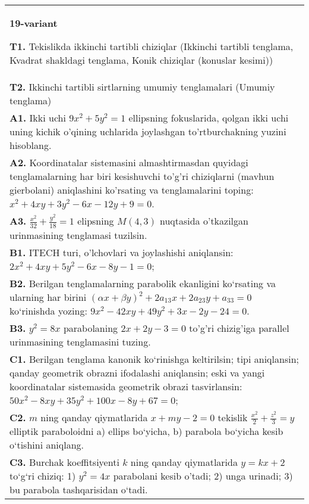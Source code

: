 \documentclass{article}
\begin{document}
\begin{tabular}{m{17cm}}
\textbf{19-variant}
\newline

\textbf{T1.} Tekislikda ikkinchi tartibli chiziqlar (Ikkinchi tartibli tenglama, Kvadrat shakldagi tenglama, Konik chiziqlar (konuslar kesimi)) \\
\textbf{T2.} Ikkinchi tartibli sirtlarning umumiy tenglamalari (Umumiy tenglama) \\
\textbf{A1.} Ikki uchi $9 x^2+5 y^2=1$ ellipsning fokuslarida, qolgan ikki uchi uning kichik o'qining uchlarida joylashgan to'rtburchakning yuzini hisoblang. \\
\textbf{A2.} Koordinatalar sistemasini almashtirmasdan quyidagi tenglamalarning har biri kesishuvchi to'g'ri chiziqlarni (mavhun gierbolani) aniqlashini ko'rsating va tenglamalarini toping: $x^2+4 x y+3 y^2-6 x-12 y+9=0$. \\
\textbf{A3.} $\frac{x^2}{32}+\frac{y^2}{18}=1$ elipsning $M(4,3)$ nuqtasida o'tkazilgan urinmasining tenglamasi tuzilsin. \\
\textbf{B1.} ITECH turi, o'lchovlari va joylashishi aniqlansin: $2 x^2+4 x y+5 y^2-6 x-8 y-1=0$; \\
\textbf{B2.} Berilgan tenglamalarning parabolik ekanligini ko‘rsating va ularning har birini $(\alpha x+\beta y)^2+2 a_{13} x+2 a_{23} y+a_{33}=0$ ko‘rinishda yozing: $9 x^2-42 x y+49 y^2+3 x-2 y-24=0$. \\
\textbf{B3.} $y^2=8x$ parabolaning $2x+2y-3=0$ to'g'ri chizig'iga parallel urinmasining tenglamasini tuzing. \\
\textbf{C1.} Berilgan tenglama kanonik ko‘rinishga keltirilsin; tipi aniqlansin; qanday geometrik obrazni ifodalashi aniqlansin; eski va yangi koordinatalar sistemasida geometrik obrazi tasvirlansin: $50 x^2-8 x y+35 y^2+100 x-8 y+67=0$; \\
\textbf{C2.} $m$ ning qanday qiymatlarida $x+m y-2=0$ tekislik $\frac{x^2}{2}+\frac{z^2}{3}=y$ elliptik paraboloidni a) ellips bo‘yicha, b) parabola bo‘yicha kesib o‘tishini aniqlang. \\
\textbf{C3.} Burchak koeffitsiyenti $k$ ning qanday qiymatlarida $y=kx+2$ to‘g‘ri chiziq: 1) $y^2=4x$ parabolani kesib o'tadi; 2) unga urinadi; 3) bu parabola tashqarisidan o‘tadi. \\

\end{tabular}
\vspace{1cm}
\end{document}
